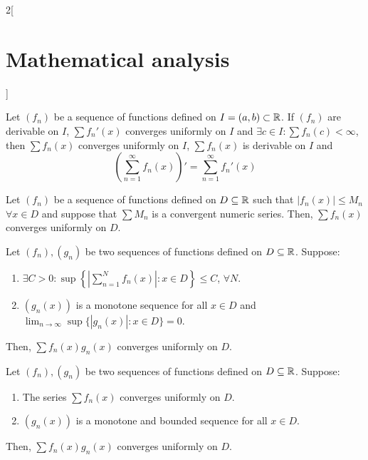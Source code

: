 \documentclass[../../../main_math.tex]{subfiles}
\begin{document}
\begin{multicols}{2}[\section{Mathematical analysis}]
\begin{theorem}
  \end{theorem}
  \begin{theorem}
    Let $(f_n)$ be a sequence of functions defined on $I=(a,b)\subset\mathbb{R} $. If $(f_n)$ are derivable on $I$, $\sum f_n'(x)$ converges uniformly on $I$ and $\exists c\in I:\sum f_n(c)<\infty$, then $\sum f_n(x)$ converges uniformly on $I$, $\sum f_n(x)$ is derivable on $I$ and $$\left(\sum_{n=1}^\infty f_n(x)\right)'=\sum_{n=1}^\infty f_n'(x)$$
  \end{theorem}
  \begin{theorem}\label{MA:Mweierstrass}
    Let $(f_n)$ be a sequence of functions defined on $D\subseteq\mathbb{R} $ such that $|f_n(x)|\leq M_n$ $\forall x\in D$ and suppose that $\sum M_n$ is a convergent numeric series. Then, $\sum f_n(x)$ converges uniformly on $D$.
  \end{theorem}
  \begin{theorem}
    Let $(f_n),(g_n)$ be two sequences of functions defined on $D\subseteq\mathbb{R} $. Suppose:
    \begin{enumerate}
      \item $\displaystyle\exists C>0: \sup\left\{\left|\sum_{n=1}^Nf_n(x)\right|:x\in D\right\}\leq C$, $\forall N$.
      \item $(g_n(x))$ is a monotone sequence for all $x\in D$ and $\displaystyle\lim_{n\to\infty}\sup\{|g_n(x)|:x\in D\}=0$.
    \end{enumerate}
    Then, $\sum f_n(x)g_n(x)$ converges uniformly on $D$.
  \end{theorem}
  \begin{theorem}
    Let $(f_n),(g_n)$ be two sequences of functions defined on $D\subseteq\mathbb{R} $. Suppose:
    \begin{enumerate}
      \item The series $\sum f_n(x)$ converges uniformly on $D$.
      \item $(g_n(x))$ is a monotone and bounded sequence for all $x\in D$.
    \end{enumerate}
    Then, $\sum f_n(x)g_n(x)$ converges uniformly on $D$.
  \end{theorem}

\end{multicols}
\end{document}

